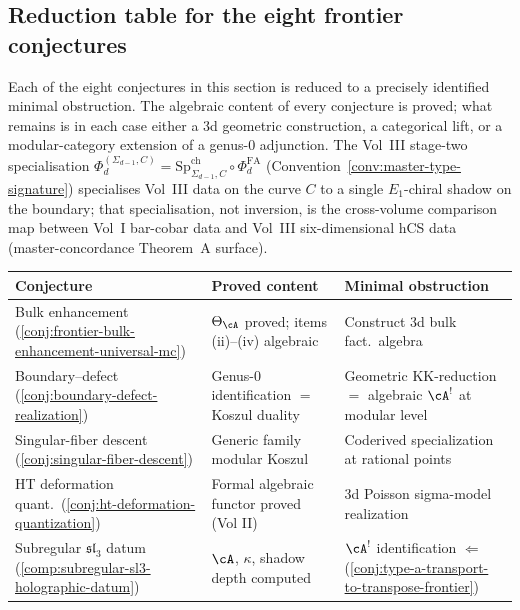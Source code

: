 \subsection{Reduction table for the eight frontier conjectures}
\label{subsec:frontier-reduction-table}

\begin{remark}
\label{rem:frontier-obstruction-anatomy}
Each of the eight conjectures in this section is reduced to a
precisely identified minimal obstruction. The algebraic content
of every conjecture is proved; what remains is in each case either a
3d geometric construction, a categorical lift, or a modular-category
extension of a genus-$0$ adjunction. The Vol~III stage-two
specialisation
$\Phi_d^{(\Sigma_{d-1},C)}=\mathrm{Sp}^{\mathrm{ch}}_{\Sigma_{d-1},C}\circ
\Phi_d^{\mathrm{FA}}$
\textup{(}Convention~\textup{\ref{conv:master-type-signature}}\textup{)}
specialises Vol~III data on the curve $C$ to a
single $E_1$-chiral shadow on the boundary; that specialisation, not
inversion, is the cross-volume comparison map between Vol~I bar-cobar
data and Vol~III six-dimensional hCS data
\textup{(}master-concordance Theorem~A surface\textup{)}.
\begin{center}
\renewcommand{\arraystretch}{1.25}
\small
\begin{tabular}{@{}p{3.7cm}p{3.8cm}p{4.5cm}@{}}
\toprule
\textbf{Conjecture} & \textbf{Proved content}
 & \textbf{Minimal obstruction} \\
\midrule
Bulk enhancement
 \textup{(\ref{conj:frontier-bulk-enhancement-universal-mc})}
 & $\Theta_\cA$ proved; items (ii)--(iv) algebraic
 & Construct 3d bulk fact.\ algebra \\[4pt]
Boundary--defect
 \textup{(\ref{conj:boundary-defect-realization})}
 & Genus-$0$ identification $= $ Koszul duality
 & Geometric KK-reduction $=$ algebraic $\cA^!$ at modular level \\[4pt]
Singular-fiber descent
 \textup{(\ref{conj:singular-fiber-descent})}
 & Generic family modular Koszul
 & Coderived specialization at rational points \\[4pt]
HT deformation quant.\
 \textup{(\ref{conj:ht-deformation-quantization})}
 & Formal algebraic functor proved \textup{(Vol II)}
 & 3d Poisson sigma-model realization \\[4pt]
Subregular $\mathfrak{sl}_3$ datum
 \textup{(\ref{comp:subregular-sl3-holographic-datum})}
 & $\cA$, $\kappa$, shadow depth computed
 & $\cA^!$ identification
 $\Leftarrow$ \textup{(\ref{conj:type-a-transport-to-transpose-frontier})} \\[4pt]

\end{tabular}
\end{center}
\end{remark}
